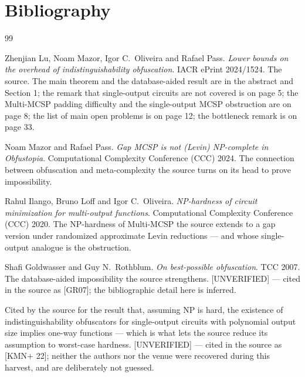\documentclass{aicr-conjecture}
\begin{document}
\section{Bibliography}

\begin{aicrbibliography}{99}

Zhenjian Lu, Noam Mazor, Igor C.\ Oliveira and Rafael Pass.
\emph{Lower bounds on the overhead of indistinguishability obfuscation}.
IACR ePrint 2024/1524.
The source. The main theorem and the database-aided result are in the
abstract and Section 1; the remark that single-output circuits are not
covered is on page 5; the Multi-MCSP padding difficulty and the
single-output MCSP obstruction are on page 8; the list of main open
problems is on page 12; the bottleneck remark is on page 33.

Noam Mazor and Rafael Pass.
\emph{Gap MCSP is not (Levin) NP-complete in Obfustopia}.
Computational Complexity Conference (CCC) 2024.
The connection between obfuscation and meta-complexity the source turns
on its head to prove impossibility.

Rahul Ilango, Bruno Loff and Igor C.\ Oliveira.
\emph{NP-hardness of circuit minimization for multi-output functions}.
Computational Complexity Conference (CCC) 2020.
The NP-hardness of Multi-MCSP the source extends to a gap version under
randomized approximate Levin reductions --- and whose single-output
analogue is the obstruction.

Shafi Goldwasser and Guy N.\ Rothblum.
\emph{On best-possible obfuscation}.
TCC 2007.
The database-aided impossibility the source strengthens. [UNVERIFIED] ---
cited in the source as [GR07]; the bibliographic detail here is inferred.

Cited by the source for the result that, assuming NP is hard, the
existence of indistinguishability obfuscators for single-output circuits
with polynomial output size implies one-way functions --- which is what lets
the source reduce its assumption to worst-case hardness. [UNVERIFIED] ---
cited in the source as [KMN+ 22]; neither the authors nor the venue were
recovered during this harvest, and are deliberately not guessed.

\end{aicrbibliography}
\end{document}

